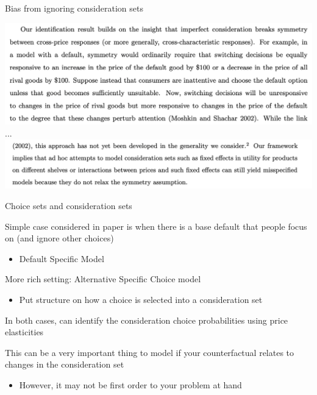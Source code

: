 \documentclass[notes,11pt, aspectratio=169]{beamer}
\newenvironment{wideitemize}{\itemize\addtolength{\itemsep}{10pt}}{\enditemize}
\begin{document}
\begin{frame}{Bias from ignoring consideration sets}
  \begin{center}
  \includegraphics[width=\linewidth]{images/abaluck1.png}\\
  ...
  \includegraphics[width=\linewidth]{images/abaluck2.png}  
\end{center}
\end{frame}
\begin{frame}{Choice sets and consideration sets}
  \begin{wideitemize}
  \item Simple case considered in paper is when there is a base
    default that people focus on (and ignore other choices)
    \begin{itemize}
    \item Default Specific Model
    \end{itemize}
  \item More rich setting: Alternative Specific Choice model
    \begin{itemize}
    \item Put structure on how a choice is selected into a consideration set
    \end{itemize}
  \item In both cases, can identify the consideration choice
    probabilities using price elasticities
  \item This can be a very important thing to model if your
    counterfactual relates to changes in the consideration set
    \begin{itemize}
    \item However, it may not be first order to your problem at hand
    \end{itemize}
  \end{wideitemize}
\end{frame}
\end{document}

